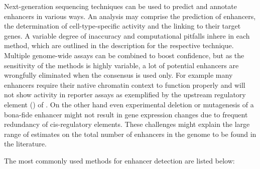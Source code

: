 Next-generation sequencing techniques can be used to predict and annotate enhancers in various ways. An analysis may comprise the prediction of enhancers, the determination of cell-type-specific activity and the linking to their target genes\cite{Lim2018,Ramisch2019}. A variable degree of inaccuracy and computational pitfalls inhere in each method, which are outlined in the description for the respective technique. Multiple genome-wide assays can be combined to boost confidence\cite{Benton2019}, but as the sensitivity of the methods is highly variable, a lot of potential enhancers are wrongfully eliminated when the consensus is used only. For example many enhancers require their native chromatin context to function properly\cite{Inoue2016} and will not show activity in reporter assays as exemplified by the upstream regulatory element () of \cite{Li2001,Rosenbauer2004,Rosenbauer2006,Leddin2011}. On the other hand even experimental deletion or mutagenesis of a bona-fide enhancer might not result in gene expression changes due to frequent redundancy of cis-regulatory elements\cite{Osterwalder2018}. These challenges might explain the large range of estimates on the total number of enhancers in the genome to be found in the literature.

The most commonly used methods for enhancer detection are listed below:

